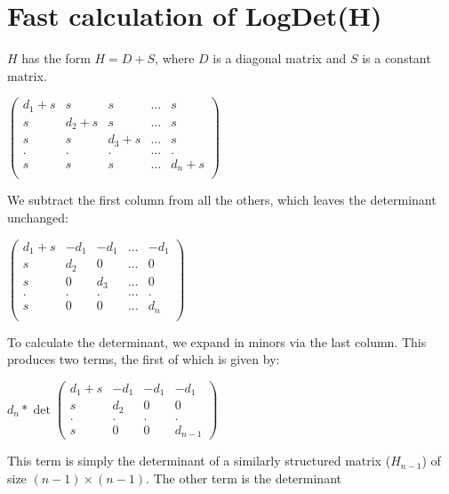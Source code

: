 \documentclass[12pt]{article}
\begin{document}
\section{Fast calculation of LogDet(H)}

$H$ has the form $H = D + S$, where $D$ is a diagonal matrix and $S$ is a constant matrix.  

\begin{math}
\begin{pmatrix}
 d_1 + s & s       & s       & ... & s   \\
 s       & d_2 + s & s       & ... & s   \\
 s       & s       & d_3 + s & ... & s   \\
 .       & .       & .       & ... & .   \\
 s       & s       & s       & ... & d_n + s \\
\end{pmatrix}
\end{math}

We subtract the first column from all the others, which leaves the determinant unchanged:

\begin{math}
\begin{pmatrix}
 d_1 + s & -d_1  & -d_1 & ... & -d_1   \\
 s   & d_2   & 0    & ... & 0   \\
 s   & 0     & d_3  & ... & 0   \\
 .   & .     & .    & ... & .   \\
 s   & 0     & 0    & ... & d_n \\
\end{pmatrix}
\end{math}

To calculate the determinant, we expand in minors via the last column.  This produces two terms, the first of which is given by:

\begin{math}
d_n * \det
\begin{pmatrix}
 d_1 + s & -d_1  & -d_1 & -d_1 \\
 s   & d_2   & 0        & 0    \\
 .   & .     & .        & . \\
 s   & 0     & 0        & d_{n-1} 
\end{pmatrix}
\end{math}

This term is simply the determinant of a similarly structured matrix ($H_{n-1}$) of size $(n-1)\times(n-1)$.  The other term is the determinant
\end{document}
